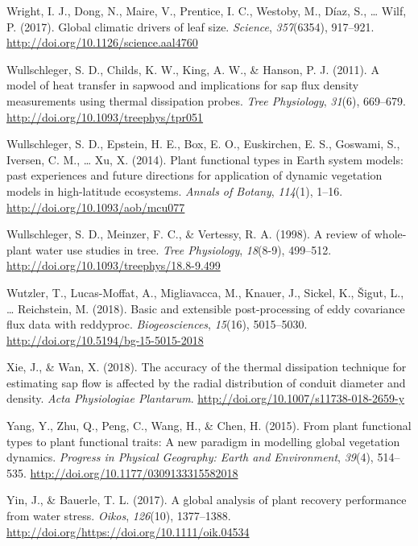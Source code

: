 \documentclass[11pt,twoside]{reedthesis}
\begin{document}
\hypertarget{ref-wright_global_2017}{}
Wright, I. J., Dong, N., Maire, V., Prentice, I. C., Westoby, M., Díaz,
S., \ldots{} Wilf, P. (2017). Global climatic drivers of leaf size.
\emph{Science}, \emph{357}(6354), 917--921.
\url{http://doi.org/10.1126/science.aal4760}

\hypertarget{ref-Wullschleger2011}{}
Wullschleger, S. D., Childs, K. W., King, A. W., \& Hanson, P. J.
(2011). A model of heat transfer in sapwood and implications for sap
flux density measurements using thermal dissipation probes. \emph{Tree
Physiology}, \emph{31}(6), 669--679.
\url{http://doi.org/10.1093/treephys/tpr051}

\hypertarget{ref-Wullschleger2014}{}
Wullschleger, S. D., Epstein, H. E., Box, E. O., Euskirchen, E. S.,
Goswami, S., Iversen, C. M., \ldots{} Xu, X. (2014). Plant functional
types in Earth system models: past experiences and future directions for
application of dynamic vegetation models in high-latitude ecosystems.
\emph{Annals of Botany}, \emph{114}(1), 1--16.
\url{http://doi.org/10.1093/aob/mcu077}

\hypertarget{ref-Wullschleger1998}{}
Wullschleger, S. D., Meinzer, F. C., \& Vertessy, R. A. (1998). A review
of whole-plant water use studies in tree. \emph{Tree Physiology},
\emph{18}(8-9), 499--512.
\url{http://doi.org/10.1093/treephys/18.8-9.499}

\hypertarget{ref-Wutzler2018}{}
Wutzler, T., Lucas-Moffat, A., Migliavacca, M., Knauer, J., Sickel, K.,
Šigut, L., \ldots{} Reichstein, M. (2018). Basic and extensible
post-processing of eddy covariance flux data with reddyproc.
\emph{Biogeosciences}, \emph{15}(16), 5015--5030.
\url{http://doi.org/10.5194/bg-15-5015-2018}

\hypertarget{ref-Xie2018}{}
Xie, J., \& Wan, X. (2018). The accuracy of the thermal dissipation
technique for estimating sap flow is affected by the radial distribution
of conduit diameter and density. \emph{Acta Physiologiae Plantarum}.
\url{http://doi.org/10.1007/s11738-018-2659-y}

\hypertarget{ref-Yang2015}{}
Yang, Y., Zhu, Q., Peng, C., Wang, H., \& Chen, H. (2015). From plant
functional types to plant functional traits: A new paradigm in modelling
global vegetation dynamics. \emph{Progress in Physical Geography: Earth
and Environment}, \emph{39}(4), 514--535.
\url{http://doi.org/10.1177/0309133315582018}

\hypertarget{ref-Yin2017}{}
Yin, J., \& Bauerle, T. L. (2017). A global analysis of plant recovery
performance from water stress. \emph{Oikos}, \emph{126}(10), 1377--1388.
\url{http://doi.org/https://doi.org/10.1111/oik.04534}
\end{document}
